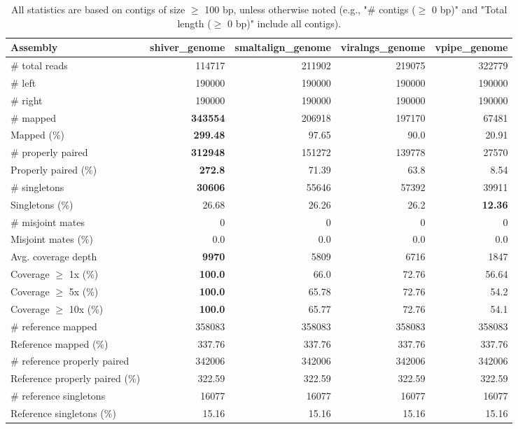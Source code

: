 \documentclass[12pt,a4paper]{article}
\begin{document}
\begin{table}[ht]
\begin{center}
\caption{All statistics are based on contigs of size $\geq$ 100 bp, unless otherwise noted (e.g., "\# contigs ($\geq$ 0 bp)" and "Total length ($\geq$ 0 bp)" include all contigs).}
\begin{tabular}{|l*{4}{|r}|}
\hline
Assembly & shiver\_genome & smaltalign\_genome & viralngs\_genome & vpipe\_genome \\ \hline
\# total reads & 114717 & 211902 & 219075 & 322779 \\ \hline
\# left & 190000 & 190000 & 190000 & 190000 \\ \hline
\# right & 190000 & 190000 & 190000 & 190000 \\ \hline
\# mapped & {\bf 343554} & 206918 & 197170 & 67481 \\ \hline
Mapped (\%) & {\bf 299.48} & 97.65 & 90.0 & 20.91 \\ \hline
\# properly paired & {\bf 312948} & 151272 & 139778 & 27570 \\ \hline
Properly paired (\%) & {\bf 272.8} & 71.39 & 63.8 & 8.54 \\ \hline
\# singletons & {\bf 30606} & 55646 & 57392 & 39911 \\ \hline
Singletons (\%) & 26.68 & 26.26 & 26.2 & {\bf 12.36} \\ \hline
\# misjoint mates & 0 & 0 & 0 & 0 \\ \hline
Misjoint mates (\%) & 0.0 & 0.0 & 0.0 & 0.0 \\ \hline
Avg. coverage depth & {\bf 9970} & 5809 & 6716 & 1847 \\ \hline
Coverage $\geq$ 1x (\%) & {\bf 100.0} & 66.0 & 72.76 & 56.64 \\ \hline
Coverage $\geq$ 5x (\%) & {\bf 100.0} & 65.78 & 72.76 & 54.2 \\ \hline
Coverage $\geq$ 10x (\%) & {\bf 100.0} & 65.77 & 72.76 & 54.1 \\ \hline
\# reference mapped & 358083 & 358083 & 358083 & 358083 \\ \hline
Reference mapped (\%) & 337.76 & 337.76 & 337.76 & 337.76 \\ \hline
\# reference properly paired & 342006 & 342006 & 342006 & 342006 \\ \hline
Reference properly paired (\%) & 322.59 & 322.59 & 322.59 & 322.59 \\ \hline
\# reference singletons & 16077 & 16077 & 16077 & 16077 \\ \hline
Reference singletons (\%) & 15.16 & 15.16 & 15.16 & 15.16 \\ \hline

\end{tabular}
\end{center}
\end{table}
\end{document}
